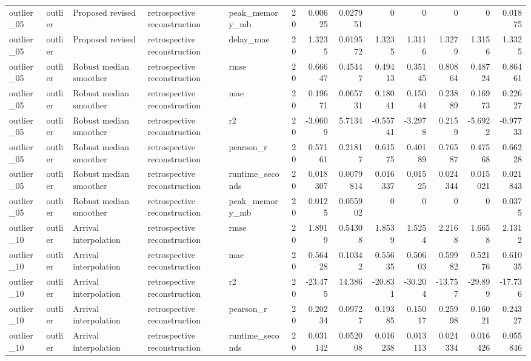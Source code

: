 \begin{table}[!htbp]
{{\begin{tabular}{lllllrrrrrrrr}
outlier_05 & outlier & Proposed revised & retrospective reconstruction & peak_memory_mb & 20 & 0.00625 & 0.027951 & 0 & 0 & 0 & 0 & 0.01875 \\
outlier_05 & outlier & Proposed revised & retrospective reconstruction & delay_mae & 20 & 1.3235 & 0.019572 & 1.3235 & 1.3116 & 1.3279 & 1.3156 & 1.3325 \\
outlier_05 & outlier & Robust median smoother & retrospective reconstruction & rmse & 20 & 0.66647 & 0.45447 & 0.49413 & 0.35145 & 0.80864 & 0.48724 & 0.86461 \\
outlier_05 & outlier & Robust median smoother & retrospective reconstruction & mae & 20 & 0.19671 & 0.065731 & 0.18041 & 0.15044 & 0.23889 & 0.16973 & 0.22627 \\
outlier_05 & outlier & Robust median smoother & retrospective reconstruction & r2 & 20 & -3.0609 & 5.7134 & -0.55741 & -3.2978 & 0.2159 & -5.6922 & -0.97733 \\
outlier_05 & outlier & Robust median smoother & retrospective reconstruction & pearson_r & 20 & 0.57161 & 0.21817 & 0.61575 & 0.40189 & 0.76587 & 0.47568 & 0.66228 \\
outlier_05 & outlier & Robust median smoother & retrospective reconstruction & runtime_seconds & 20 & 0.018307 & 0.0079814 & 0.016337 & 0.01525 & 0.024344 & 0.015021 & 0.021843 \\
outlier_05 & outlier & Robust median smoother & retrospective reconstruction & peak_memory_mb & 20 & 0.0125 & 0.055902 & 0 & 0 & 0 & 0 & 0.0375 \\
outlier_10 & outlier & Arrival interpolation & retrospective reconstruction & rmse & 20 & 1.8919 & 0.54308 & 1.8539 & 1.5254 & 2.2168 & 1.6658 & 2.1312 \\
outlier_10 & outlier & Arrival interpolation & retrospective reconstruction & mae & 20 & 0.56428 & 0.10342 & 0.55635 & 0.50603 & 0.59982 & 0.52176 & 0.61035 \\
outlier_10 & outlier & Arrival interpolation & retrospective reconstruction & r2 & 20 & -23.475 & 14.386 & -20.831 & -30.204 & -13.757 & -29.899 & -17.736 \\
outlier_10 & outlier & Arrival interpolation & retrospective reconstruction & pearson_r & 20 & 0.20234 & 0.09727 & 0.19385 & 0.15017 & 0.25998 & 0.16021 & 0.24327 \\
outlier_10 & outlier & Arrival interpolation & retrospective reconstruction & runtime_seconds & 20 & 0.031142 & 0.052008 & 0.016238 & 0.013113 & 0.024334 & 0.016426 & 0.055846 \\

\end{tabular}}}
\end{table}

